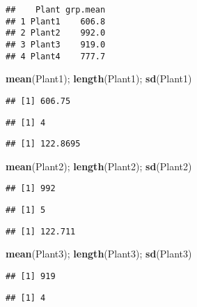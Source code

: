 \documentclass[]{article}
\newenvironment{Shaded}{\begin{snugshade}}{\end{snugshade}}
\newcommand{\KeywordTok}[1]{\textcolor[rgb]{0.13,0.29,0.53}{\textbf{#1}}}
\newcommand{\NormalTok}[1]{#1}
\begin{document}
\begin{verbatim}
##    Plant grp.mean
## 1 Plant1    606.8
## 2 Plant2    992.0
## 3 Plant3    919.0
## 4 Plant4    777.7
\end{verbatim}

\begin{Shaded}
\begin{Highlighting}[]
\KeywordTok{mean}\NormalTok{(Plant1); }\KeywordTok{length}\NormalTok{(Plant1); }\KeywordTok{sd}\NormalTok{(Plant1)}
\end{Highlighting}
\end{Shaded}

\begin{verbatim}
## [1] 606.75
\end{verbatim}

\begin{verbatim}
## [1] 4
\end{verbatim}

\begin{verbatim}
## [1] 122.8695
\end{verbatim}

\begin{Shaded}
\begin{Highlighting}[]
\KeywordTok{mean}\NormalTok{(Plant2); }\KeywordTok{length}\NormalTok{(Plant2); }\KeywordTok{sd}\NormalTok{(Plant2)}
\end{Highlighting}
\end{Shaded}

\begin{verbatim}
## [1] 992
\end{verbatim}

\begin{verbatim}
## [1] 5
\end{verbatim}

\begin{verbatim}
## [1] 122.711
\end{verbatim}

\begin{Shaded}
\begin{Highlighting}[]
\KeywordTok{mean}\NormalTok{(Plant3); }\KeywordTok{length}\NormalTok{(Plant3); }\KeywordTok{sd}\NormalTok{(Plant3)}
\end{Highlighting}
\end{Shaded}

\begin{verbatim}
## [1] 919
\end{verbatim}

\begin{verbatim}
## [1] 4
\end{verbatim}
\end{document}
